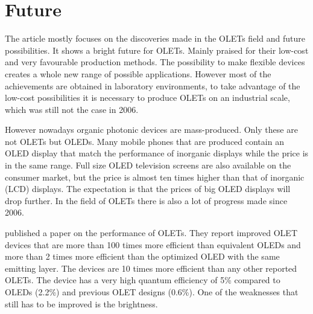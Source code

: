 \section{Future}\label{sec:future}
The article mostly focuses on the discoveries made in the OLETs field and future possibilities. It shows a bright future for OLETs. Mainly praised for their low-cost and very favourable production methods. The possibility to make flexible devices creates a whole new range of possible applications. However most of the achievements are obtained in laboratory environments, to take advantage of the low-cost possibilities it is necessary to produce OLETs on an industrial scale, which was still not the case in 2006.

However nowadays organic photonic devices are mass-produced. Only these are not OLETs but OLEDs. Many mobile phones that are produced contain an OLED display that match the performance of inorganic displays while the price is in the same range. Full size OLED television screens are also available on the consumer market, but the price is almost ten times higher than that of inorganic (LCD) displays. The expectation is that the prices of big OLED displays will drop further. In the field of OLETs there is also a lot of progress made since 2006. 

\citet{Capelli} published a paper on the performance of OLETs. They report improved OLET devices that are more than 100 times more efficient than equivalent OLEDs and more than 2 times more efficient than the optimized OLED with the same emitting layer. The devices are 10 times more efficient than any other reported OLETs. The device has a very high quantum efficiency of 5\% compared to OLEDs (2.2\%) and previous OLET designs (0.6\%). One of the weaknesses that still has to be improved is the brightness.
